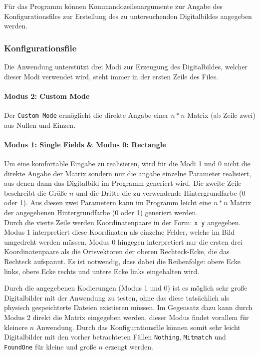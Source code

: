 Für das Programm können Kommandozeilenargumente zur Angabe des Konfigurationsfiles zur Erstellung des zu untersuchenden Digitalbildes angegeben werden.

\subsubsection{Konfigurationsfile}
Die Anwendung unterstützt drei Modi zur Erzeugung des Digitalbildes, welcher dieser Modi verwendet wird, steht immer in der ersten Zeile des Files.

\paragraph{Modus 2: Custom Mode}Der \texttt{Custom Mode} ermöglicht die direkte Angabe einer $n*n$ Matrix (ab Zeile zwei) aus Nullen und Einzen.

\paragraph{Modus 1: Single Fields \& Modus 0: Rectangle}
Um eine komfortable Eingabe zu realisieren, wird für die Modi 1 und 0 nicht die direkte Angabe der Matrix sondern nur die angabe einzelne Parameter realisiert, aus denen dann das Digitalbild im Programm generiert wird. Die zweite Zeile beschreibt die Größe $n$ und die Dritte die zu verwendende Hintergrundfarbe (0 oder 1). Aus diesen zwei Parametern kann im Programm leicht eine $n*n$ Matrix der angegebenen Hintergrundfarbe (0 oder 1) generiert werden. \\
Durch die vierte Zeile werden Koordinatenpaare in der Form: \texttt{x y} angegeben. Modus 1 interpretiert diese Koordinaten als einzelne Felder, welche im Bild umgedreht werden müssen. Modus 0 hingegen interpretiert nur die ersten drei Koordinatenpaare als die Ortsvektoren der oberen Rechteck-Ecke, die das Rechteck aufspannt. Es ist notwendig, dass dabei die Reihenfolge: obere Ecke links, obere Ecke rechts und untere Ecke links eingehalten wird.

Durch die angegebenen Kodierungen (Modus 1 und 0) ist es möglich sehr große Digitalbilder mit der Anwendung zu testen, ohne das diese tatsächlich  als physisch gespeichterte Dateien existieren müssen. Im Gegensatz dazu kann durch Modus 2 direkt die Matrix eingegeben werden, dieser Modus findet vorallem für kleinere $n$ Anwendung. Durch das Konfigurationsfile können somit sehr leicht Digitalbilder mit den vorher betrachteten Fällen \texttt{Nothing}, \texttt{Mitmatch} und \texttt{FoundOne} für kleine und große $n$ erzeugt werden.
